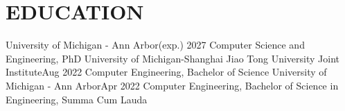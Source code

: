 \section{EDUCATION}
  \resumeSubHeadingListStart
  
    \resumeSubheading
    {University of Michigan - Ann Arbor}{(exp.) 2027 }
    {Computer Science and Engineering, PhD}{}
        \resumeItemListStart
        \resumeItemListEnd
    \resumeSubheading
    {University of Michigan-Shanghai Jiao Tong University Joint Institute}{Aug 2022}
    {Computer Engineering, Bachelor of Science}{}
    \resumeSubheading
    {University of Michigan - Ann Arbor}{Apr 2022}
    {Computer Engineering, Bachelor of Science in Engineering, Summa Cum Lauda}{}
    \resumeItemListStart
    \resumeItemListEnd

        
  \resumeSubHeadingListEnd